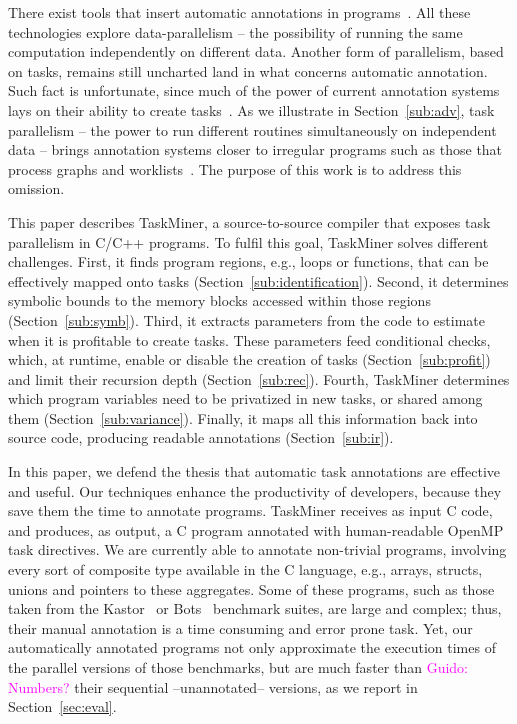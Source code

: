 \documentclass[sigplan,10pt,review,anonymous]{acmart}
\newcommand{\guido}[1]{\noindent\textcolor{magenta}{Guido: {#1}}}
\newcommand{\guido}[1]{}
\newcommand\Taskminer{\mbox{\textsf{TaskMiner}}}
\begin{document}
There exist tools that insert automatic annotations in
programs~\cite{Amini12,Guelton12,Mendonca16,Pingali11,Nugteren14}.
All these technologies explore data-parallelism -- the possibility of running
the same computation independently on different data.
Another form of parallelism, based on tasks, remains still uncharted land in what
concerns automatic annotation.
Such fact is unfortunate, since much of the power of current annotation
systems lays on their ability to create tasks~\cite{Ayguade09}.
As we illustrate in Section~\ref{sub:adv}, task parallelism -- the power to run
different routines simultaneously on independent data -- brings annotation systems
closer to irregular programs such as those that process graphs and
worklists~\cite{Ben-Nun17,Kulkarni11,Pingali11}.
The purpose of this work is to address this omission.

This paper describes \Taskminer, a source-to-source compiler that exposes task
parallelism in C/C++ programs.
To fulfil this goal, \Taskminer{} solves different challenges.
First, it finds program regions, e.g., loops or functions, that can be
effectively mapped onto tasks (Section~\ref{sub:identification}).
Second, it determines symbolic bounds to the memory blocks accessed within
those regions (Section~\ref{sub:symb}).
Third, it extracts parameters from the code to estimate when it is profitable to
create tasks.
These parameters feed conditional checks, which, at runtime, enable or disable
the creation of tasks (Section~\ref{sub:profit}) and limit their recursion
depth (Section~\ref{sub:rec}).
Fourth, \Taskminer{} determines which program variables need to be 
privatized in new tasks, or shared among them (Section~\ref{sub:variance}).
Finally, it maps all this information back into source code, producing
readable annotations (Section~\ref{sub:ir}).

In this paper, we defend the thesis that automatic task annotations are
effective and useful.
Our techniques enhance the productivity of developers, because they save them
the time to annotate programs.
\Taskminer{} receives as input C code, and produces, as output, a C
program annotated with human-readable OpenMP task directives.
We are currently able to annotate non-trivial programs, involving every
sort of composite type available in the C language, e.g., arrays, structs,
unions and pointers to these aggregates.
Some of these programs, such as those taken from the
Kastor~\cite{Virouleau14} or Bots~\cite{Duran09}
benchmark suites, are large and complex; thus, their manual annotation is a
time consuming and error prone task.
Yet, our automatically annotated programs not only approximate the execution
times of the parallel versions of those benchmarks, but are much faster than
\guido{Numbers?}
their sequential --unannotated-- versions, as we report in Section~\ref{sec:eval}.
\end{document}
